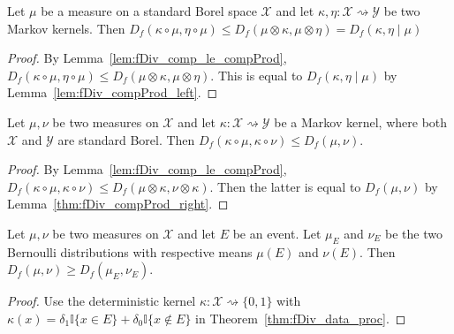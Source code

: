 \begin{theorem}
  \label{thm:fDiv_comp_le_condFDiv}
  \leanok
  Let $\mu$ be a measure on a standard Borel space $\mathcal X$ and let $\kappa, \eta : \mathcal X \rightsquigarrow \mathcal Y$ be two Markov kernels.
  Then $D_f(\kappa \circ \mu, \eta \circ \mu) \le D_f(\mu \otimes \kappa, \mu \otimes \eta) = D_f(\kappa, \eta \mid \mu)$
\end{theorem}

\begin{proof}\leanok
{}
By Lemma~\ref{lem:fDiv_comp_le_compProd}, $D_f(\kappa \circ \mu, \eta \circ \mu) \le D_f(\mu \otimes \kappa, \mu \otimes \eta)$. This is equal to $D_f(\kappa, \eta \mid \mu)$ by Lemma~\ref{lem:fDiv_compProd_left}.
\end{proof}

\begin{theorem}
  \label{thm:fDiv_data_proc}
  \leanok
  Let $\mu, \nu$ be two measures on $\mathcal X$ and let $\kappa : \mathcal X \rightsquigarrow \mathcal Y$ be a Markov kernel, where both $\mathcal X$ and $\mathcal Y$ are standard Borel.
  Then $D_f(\kappa \circ \mu, \kappa \circ \nu) \le D_f(\mu, \nu)$.
\end{theorem}

\begin{proof}\leanok
{}
By Lemma~\ref{lem:fDiv_comp_le_compProd}, $D_f(\kappa \circ \mu, \kappa \circ \nu) \le D_f(\mu \otimes \kappa, \nu \otimes \kappa)$. Then the latter is equal to $D_f(\mu, \nu)$ by Lemma~\ref{thm:fDiv_compProd_right}.
\end{proof}


\begin{corollary}
  \label{cor:data_proc_event}
  Let $\mu, \nu$ be two measures on $\mathcal X$ and let $E$ be an event. Let $\mu_E$ and $\nu_E$ be the two Bernoulli distributions with respective means $\mu(E)$ and $\nu(E)$. Then $D_f(\mu, \nu) \ge D_f(\mu_E, \nu_E)$.
\end{corollary}

\begin{proof}
Use the deterministic kernel $\kappa : \mathcal X \rightsquigarrow \{0, 1\}$ with $\kappa(x) = \delta_1 \mathbb{I}\{x \in E\} + \delta_0 \mathbb{I}\{x \notin E\}$ in Theorem~\ref{thm:fDiv_data_proc}.
\end{proof}


